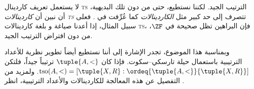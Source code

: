\documentclass[../../../include/open-logic-section]{subfiles}
\begin{document}
لا يستعمل تعريف كاردينال \textsc{ts} الترتيب الجيد. لكننا نستطيع، حتى
من دون تلك البديهية، أن نبين أن \emph{كاردينالات \textsc{ts}} تتصرف إلى
حد كبير مثل \emph{الكاردينالات} كما عُرِّفت في
. فعلى سبيل المثال،
إذا أعدنا صياغة
و بلغة كاردينالات
\textsc{ts}، فإن البراهين تظل صحيحة في $\ZF$، من دون افتراض الترتيب
الجيد.

وبمناسبة هذا الموضوع، تجدر الإشارة إلى أننا نستطيع أيضاً تطوير نظرية
للأعداد الترتيبية باستعمال حيلة تارسكي--سكوت. فإذا كان
$\tuple{A, <}$ ترتيباً جيداً، فلتكن
$\text{tso}(A, <) = [\tuple{X, R} :
\ordeq{\tuple{A, <}}{\tuple{X, R}}]$. ولمزيد من التفصيل عن هذه المعالجة
للكاردينالات والأعداد الترتيبية، انظر
\citet[chs.~9--12]{Potter2004}.
\end{document}
